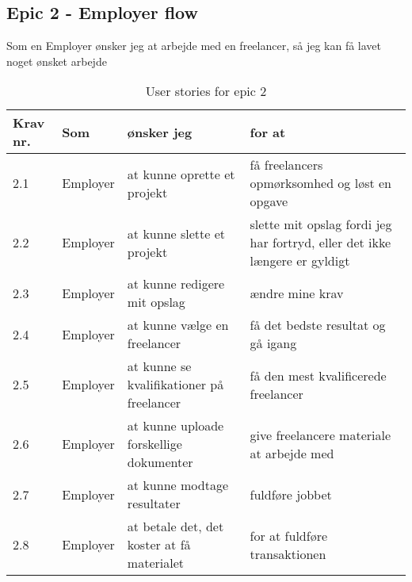 \subsection{Epic 2 - Employer flow}

Som en Employer ønsker jeg at arbejde med en freelancer, så jeg kan få lavet noget ønsket arbejde

\begin{table}[H]
    \centering
    \caption{User stories for epic 2}
    \label{tab:us-epic2}
    \begin{tabular}{l|l|l|l}
        \textbf{Krav nr.} & \textbf{Som} & \textbf{ønsker jeg}                        & \textbf{for at}                                                                                     \\
        \hline
        2.1               & Employer     & at kunne oprette et projekt                & få freelancers opmørksomhed og løst en opgave                                                       \\
        \hline
        2.2               & Employer     & at kunne slette et projekt                 & \multicolumn{1}{p{6cm}}{slette mit opslag fordi jeg har fortryd, eller det ikke længere er gyldigt} \\
        \hline
        2.3               & Employer     & at kunne redigere mit opslag               & ændre mine krav                                                                                     \\
        \hline
        2.4               & Employer     & at kunne vælge en freelancer               & få det bedste resultat og gå igang                                                                  \\
        \hline
        2.5               & Employer     & at kunne se kvalifikationer på freelancer  & få den mest kvalificerede freelancer                                                                \\
        \hline
        2.6               & Employer     & at kunne uploade forskellige dokumenter    & give freelancere materiale at arbejde med                                                           \\
        \hline
        2.7               & Employer     & at kunne modtage resultater                & fuldføre jobbet                                                                                     \\
        \hline
        2.8               & Employer     & at betale det, det koster at få materialet & for at fuldføre transaktionen                                                                       \\
    \end{tabular}
\end{table}

